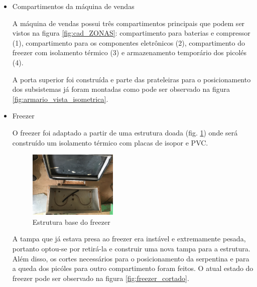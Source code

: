 \begin{itemize}
\item Compartimentos da máquina de vendas

A máquina de vendas possui três compartimentos principais que podem ser vistos na figura \ref{fig:cad_ZONAS}: compartimento para baterias e compressor (1), compartimento para os componentes eletrônicos (2), compartimento do freezer com isolamento térmico (3) e armazenamento temporário dos picolés (4).


A porta superior foi construída e parte das prateleiras para o posicionamento dos subsistemas já foram montadas como pode ser observado na figura \ref{fig:armario_vista_isometrica}.



\item Freezer

O freezer foi adaptado a partir de uma estrutura doada (fig. \ref{fig:freezer}) onde será construído um isolamento térmico com placas de isopor e PVC. 


   \begin{figure}[H]
	\centering
    \includegraphics[width=0.4\textwidth]{figuras/freezer}
    \caption{Estrutura base do freezer}
    \label{fig:freezer}
\end{figure}

A tampa que já estava presa ao freezer era instável e extremamente pesada, portanto optou-se por retirá-la e construir uma nova tampa para a estrutura. Além disso, os cortes necessários para o posicionamento da serpentina e para a queda dos picóles para outro compartimento foram feitos. O atual estado do freezer pode ser observado na figura \ref{fig:freezer_cortado}.


\end{itemize}
